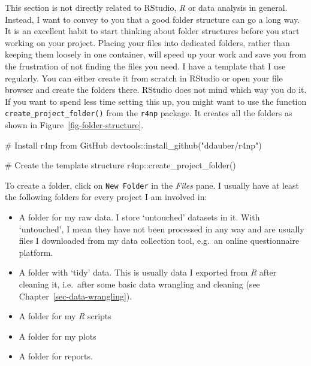 \documentclass[
  letterpaper,
]{krantz}
\makeatletter
\newenvironment{Shaded}{\begin{snugshade}}{\end{snugshade}}
\newcommand{\CommentTok}[1]{\textcolor[rgb]{0.37,0.37,0.37}{#1}}
\newcommand{\FunctionTok}[1]{\textcolor[rgb]{0.28,0.35,0.67}{#1}}
\newcommand{\NormalTok}[1]{\textcolor[rgb]{0.00,0.23,0.31}{#1}}
\newcommand{\SpecialCharTok}[1]{\textcolor[rgb]{0.37,0.37,0.37}{#1}}
\newcommand{\StringTok}[1]{\textcolor[rgb]{0.13,0.47,0.30}{#1}}
\newenvironment{kframe}{%
\medskip{}
\setlength{\fboxsep}{.8em}
 \def\at@end@of@kframe{}%
 \ifinner\ifhmode%
  \def\at@end@of@kframe{\end{minipage}}%
  \begin{minipage}{\columnwidth}%
 \fi\fi%
 \def\FrameCommand##1{\hskip\@totalleftmargin \hskip-\fboxsep
 \colorbox{shadecolor}{##1}\hskip-\fboxsep
     \hskip-\linewidth \hskip-\@totalleftmargin \hskip\columnwidth}%
 \MakeFramed {\advance\hsize-\width
   \@totalleftmargin\z@ \linewidth\hsize
   \@setminipage}}%
 {\par\unskip\endMakeFramed%
 \at@end@of@kframe}
\renewenvironment{Shaded}{\begin{kframe}}{\end{kframe}}
\makeatother
\begin{document}
This section is not directly related to RStudio, \emph{R} or data
analysis in general. Instead, I want to convey to you that a good folder
structure can go a long way. It is an excellent habit to start thinking
about folder structures before you start working on your project.
Placing your files into dedicated folders, rather than keeping them
loosely in one container, will speed up your work and save you from the
frustration of not finding the files you need. I have a template that I
use regularly. You can either create it from scratch in RStudio or open
your file browser and create the folders there. RStudio does not mind
which way you do it. If you want to spend less time setting this up, you
might want to use the function \texttt{create\_project\_folder()} from
the \texttt{r4np} package. It creates all the folders as shown in
Figure~\ref{fig-folder-structure}.

\begin{Shaded}
\begin{Highlighting}[]
\CommentTok{\# Install \textquotesingle{}r4np\textquotesingle{} from GitHub}
\NormalTok{devtools}\SpecialCharTok{::}\FunctionTok{install\_github}\NormalTok{(}\StringTok{"ddauber/r4np"}\NormalTok{)}

\CommentTok{\# Create the template structure}
\NormalTok{r4np}\SpecialCharTok{::}\FunctionTok{create\_project\_folder}\NormalTok{()}
\end{Highlighting}
\end{Shaded}

To create a folder, click on \texttt{New\ Folder} in the \emph{Files}
pane. I usually have at least the following folders for every project I
am involved in:

\begin{itemize}
\item
  A folder for my raw data. I store `untouched' datasets in it. With
  `untouched', I mean they have not been processed in any way and are
  usually files I downloaded from my data collection tool, e.g.~an
  online questionnaire platform.
\item
  A folder with `tidy' data. This is usually data I exported from
  \emph{R} after cleaning it, i.e.~after some basic data wrangling and
  cleaning (see Chapter~\ref{sec-data-wrangling}).
\item
  A folder for my \emph{R} scripts
\item
  A folder for my plots
\item
  A folder for reports.
\end{itemize}
\end{document}
